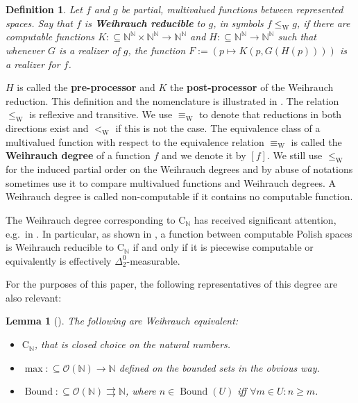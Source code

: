 \documentclass{eptcs-modified}
\newtheorem{definition}[theorem]{Definition}
\newtheorem{lemma}[theorem]{Lemma}
\newcommand{\Baire}{{\mathbb{N}^\mathbb{N}}}
\newcommand{\mto}{\rightrightarrows}
\newcommand{\leqW}{\leq_{\textrm{W}}}
\newcommand{\leW}{<_{\textrm{W}}}
\newcommand{\equivW}{\equiv_{\textrm{W}}}
\newcommand{\CCN}{\mathrm{C}_{\NN}}
\newcommand{\demph}{\textbf}
\newcommand{\C}{\textrm{C}}
\newcommand{\NN}{\mathbb{N}}
\begin{document}
			\begin{definition}\label{def:weihrauch}
				Let $f$ and $g$ be partial, multivalued functions between represented spaces.
				Say that $f$ is \demph{Weihrauch reducible} to $g$, in symbols $f\leqW g$, if there are computable
				functions $K:\subseteq \Baire\times \Baire \to\Baire$ and $H:\subseteq\Baire\to\Baire$ such that whenever $G$ is a realizer of $g$, the function $F := \left (p \mapsto K(p,G(H(p)))\right )$ is a realizer for $f$.
			\end{definition}

			$H$ is called the \demph{pre-processor} and $K$ the \demph{post-processor} of the Weihrauch reduction.
			This definition and the nomenclature is illustrated in .
			The relation $\leqW$ is reflexive and transitive.
			We use $\equivW$ to denote that reductions in both directions exist and $\leW$ if this is not the case.
			The equivalence class of a multivalued function with respect to the equivalence relation $\equivW$ is called the \demph{Weihrauch degree} of a function $f$ and we denote it by $\left[f\right]$.
			We still use $\leqW$ for the induced partial order on the Weihrauch degrees and by abuse of notations sometimes use it to compare multivalued functions and Weihrauch degrees.
			A Weihrauch degree is called non-computable if it contains no computable function.

			The Weihrauch degree corresponding to $\C_{\NN}$ has received significant attention, e.g.~in \cite{MR2760117,MR2915694,paulymaster,mylatz,mylatzb,MR3350999,paulyoracletypetwo,mummert,paulyneumann}.
			In particular, as shown in \cite{paulydebrecht}, a function between computable Polish spaces is Weihrauch reducible to $\C_\mathbb{N}$ if and only if it is piecewise computable or equivalently is effectively $\Delta^0_2$-measurable.
			
			For the purposes of this paper, the following representatives of this degree are also relevant:
			\begin{lemma}[\cite{pauly-fouche2}]\label{lemma:cn}
				The following are Weihrauch equivalent:
				\begin{itemize}
					\item $\CCN$, that is closed choice on the natural numbers.
					\item $\max : \subseteq \mathcal{O}(\mathbb{N}) \to \mathbb{N}$ defined on the bounded sets in the obvious way.
					\item $\operatorname{Bound} : \subseteq \mathcal{O}(\mathbb{N}) \mto \mathbb{N}$, where $n \in \operatorname{Bound}(U)$ iff $\forall m \in U: n \geq m$.
				\end{itemize}
			\end{lemma}
\end{document}
